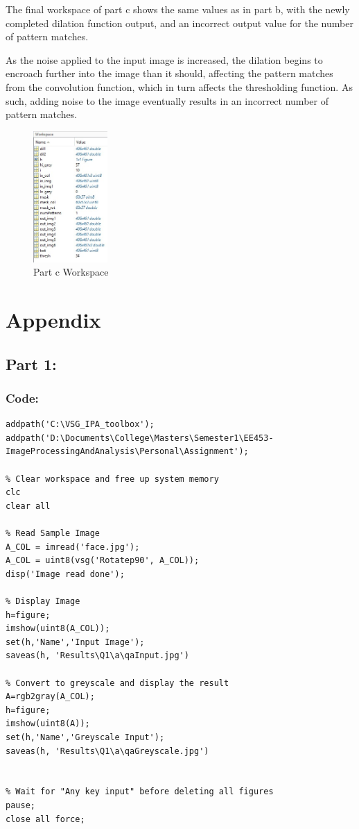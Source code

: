 \documentclass[a4paper]{article}
\begin{document}
	The final workspace of part c shows the same values as in part b, with
	the newly completed dilation function output, and an incorrect output
	value for the number of pattern matches.
	\par As the noise applied to the input image is increased, the dilation
	begins to encroach further into the image than it should, affecting the
	pattern matches from the convolution function, which in turn affects the
	thresholding function. As such, adding noise to the image eventually results
	in an incorrect number of pattern matches.
	\begin{figure}[H]
		\centering
		\includegraphics[height=5cm]{Results/Q3/c/Workspace.jpg}%
		\caption{Part c Workspace}
		\label{fig:}
	\end{figure}
	\section{Appendix}
	\subsection{Part 1:}
	\subsubsection{Code:}
	\begin{lstlisting}[caption={Part 1 a}]
	% Setup Paths to VSG Toolbox and Local Data
addpath('C:\VSG_IPA_toolbox');
addpath('D:\Documents\College\Masters\Semester1\EE453-ImageProcessingAndAnalysis\Personal\Assignment');

% Clear workspace and free up system memory
clc
clear all

% Read Sample Image
A_COL = imread('face.jpg');
A_COL = uint8(vsg('Rotatep90', A_COL));
disp('Image read done');

% Display Image
h=figure;
imshow(uint8(A_COL));
set(h,'Name','Input Image');
saveas(h, 'Results\Q1\a\qaInput.jpg')

% Convert to greyscale and display the result
A=rgb2gray(A_COL);
h=figure;
imshow(uint8(A));
set(h,'Name','Greyscale Input');
saveas(h, 'Results\Q1\a\qaGreyscale.jpg')


% Wait for "Any key input" before deleting all figures
pause;
close all force;
\end{lstlisting}
\end{document}
